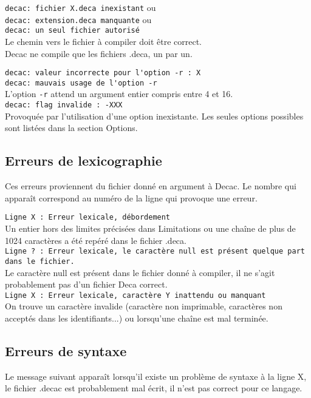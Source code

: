 \documentclass[12pt]{article}
\begin{document}
\lstinline!decac: fichier X.deca inexistant! ou\\
\lstinline!decac: extension.deca manquante! ou\\
\lstinline!decac: un seul fichier autorisé!\\
Le chemin vers le fichier à compiler doit être correct.\\
Decac ne compile que les fichiers .deca, un par un.

\lstinline!decac: valeur incorrecte pour l'option -r : X!\\
\lstinline!decac: mauvais usage de l'option -r!\\
L'option \lstinline!-r! attend un argument entier compris entre 4 et 16.\\

\lstinline!decac: flag invalide : -XXX!\\
Provoquée par l'utilisation d'une option inexistante. Les seules options 
possibles sont listées dans la section Options.

\subsection{Erreurs de lexicographie}
Ces erreurs proviennent du fichier donné en argument à Decac. Le nombre qui apparaît
correspond au numéro de la ligne qui provoque une erreur.

\lstinline!Ligne X : Erreur lexicale, débordement!\\
Un entier hors des limites
précisées dans Limitations ou une chaîne de plus de
1024 caractères a été repéré dans le fichier .deca.\\

\lstinline!Ligne ? : Erreur lexicale, le caractère null est présent quelque part dans le fichier.!\\
Le caractère null est présent dans le fichier
donné à compiler, il ne s'agit probablement pas d'un fichier Deca correct.\\

\lstinline!Ligne X : Erreur lexicale, caractère Y inattendu ou manquant!\\
On trouve un caractère invalide (caractère
non imprimable, caractères non acceptés dans les identifiants...)
ou lorsqu'une chaîne est mal terminée.\\

\subsection{Erreurs de syntaxe}
Le message suivant apparaît lorsqu'il existe un problème de syntaxe à la ligne X,
le fichier .decac est probablement mal écrit, il n'est pas correct pour ce langage.\\
\end{document}
